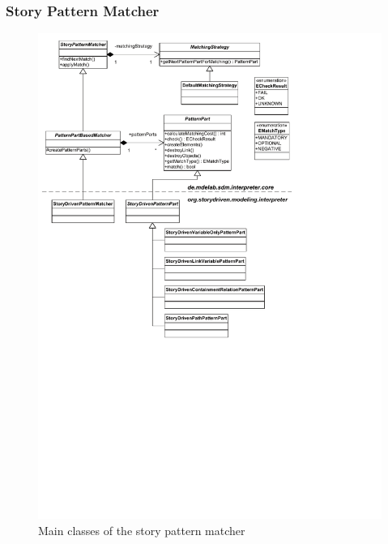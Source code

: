 \subsubsection{Story Pattern Matcher}
\label{sec:story_pattern_matcher}

\begin{figure}[htb]
  \centering
  \includegraphics[width=1.0\columnwidth]{./figures/interpreter_storyPatternMatcher.pdf}
  \caption{Main classes of the story pattern matcher}
  \label{fig:interpreter_storyPatternMatcher}
\end{figure}


